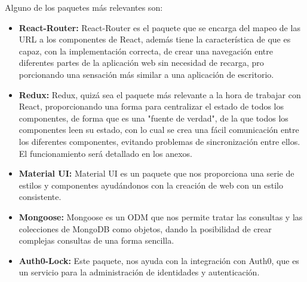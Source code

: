 Alguno de los paquetes más relevantes son:
\begin{itemize}
  \item \textbf{React-Router:} React-Router es el paquete que se encarga del mapeo de las URL a los componentes de React, además tiene la característica de que es capaz, con la implementación correcta, de crear una navegación entre diferentes partes de la aplicación web sin necesidad de recarga, pro
porcionando una sensación más similar a una aplicación de escritorio.
  \item \textbf{Redux:} Redux, quizá sea el paquete más relevante a la hora de trabajar con React, proporcionando una forma para centralizar el estado de todos los componentes, de forma que es una "fuente de verdad", de la que todos los componentes leen su estado, con lo cual se crea una fácil comunicación entre los diferentes componentes, evitando problemas de sincronización entre ellos. El funcionamiento será detallado en los anexos.
  \item \textbf{Material UI:} Material UI es un paquete que nos proporciona una serie de estilos y componentes ayudándonos con la creación de web con un estilo consistente.
  \item \textbf{Mongoose:} Mongoose es un ODM que nos permite tratar las consultas y las colecciones de MongoDB como objetos, dando la posibilidad de crear complejas consultas de una forma sencilla.
  \item \textbf{Auth0-Lock:} Este paquete, nos ayuda con la integración con Auth0, que es un servicio para la administración de identidades y autenticación.
\end{itemize}
